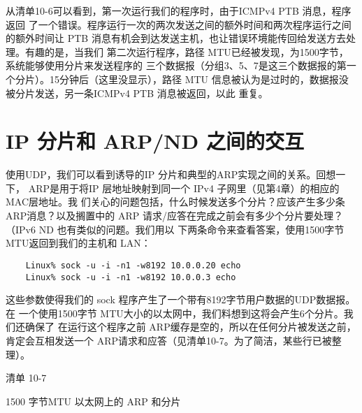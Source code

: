 从清单10-6可以看到，第一次运行我们的程序时，由于ICMPv4 PTB 消息，程序返回
了一个错误。程序运行一次的两次发送之间的额外时间和两次程序运行之间的额外时间让
PTB 消息有机会到达发送主机，也让错误环境能传回给发送方去处理。有趣的是，当我们
第二次运行程序，路径 MTU已经被发现，为1500字节，系统能够使用分片来发送程序的
三个数据报（分组3、5、7是这三个数据报的第一个分片）。15分钟后（这里没显示），路径
MTU 信息被认为是过时的，数据报没被分片发送，另一条ICMPv4 PTB 消息被返回，以此
重复。

\iffalse
\begin{tcolorbox}
  \href{https://www.rfc-editor.org/rfc/rfc1191}{[RFC1191]}推荐一个由PMTUD得到的PMTU
  值在10分钟后过时。路
  径MTU 发现有时会因为防火墙和网关过滤可能不加选择地丢弃ICMP 流量而
  出现问题，这会损害 PMTU 发现算法。因为这点，从基于系统范畴或有更好保
  证来看，可能要关闭PMTU发现。在Linux 中，文件/proc/sys/net/ipv4/ip\_no\_
  Pmtu\_disc 可以置成1以关闭PMTU发现。在 Windows 中，可以编辑注册表入口
  \verb|HKEY_LOCAL_MACHINE\System CurrentControl Set Services Topip Parameters
  EnablePMTUDiscovery| 的值0。一个不使用ICMP 的、传统 PMTUD 的替代品已
  经被开发出来\href{https://www.rfc-editor.org/rfc/rfc4821}{[RFC4821]}，我们将在第15 章介绍它。
\end{tcolorbox}
\fi

\section{IP 分片和 ARP/ND 之间的交互}

使用UDP，我们可以看到诱导的IP 分片和典型的ARP实现之间的关系。回想一下，
ARP是用于将IP 层地址映射到同一个 IPv4 子网里（见第4章）的相应的MAC层地址。我
们关心的问题包括，什么时候发送多个分片？应该产生多少条ARP消息？以及搁置中的
ARP 请求/应答在完成之前会有多少个分片要处理？（IPv6 ND 也有类似的问题。我们用以
下两条命令来查看答案，使用1500字节 MTU返回到我们的主机和 LAN：

\begin{verbatim}
    Linux% sock -u -i -n1 -w8192 10.0.0.20 echo
    Linux% sock -u -i -n1 -w8192 10.0.0.3 echo
\end{verbatim}

这些参数使得我们的 sock 程序产生了一个带有8192字节用户数据的UDP数据报。在
一个使用1500字节 MTU大小的以太网中，我们料想到这将会产生6个分片。我们还确保了
在运行这个程序之前 ARP缓存是空的，所以在任何分片被发送之前，肯定会互相发送一个
ARP请求和应答（见清单10-7。为了简洁，某些行已被整理）。

清单 10-7

1500 字节MTU 以太网上的 ARP 和分片

